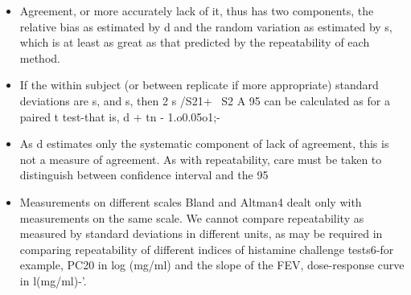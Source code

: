 \documentclass[MAIN.tex]{subfiles}
\begin{document}
\begin{itemize}
\item Agreement, or more accurately lack of it, thus
has two components, the relative bias as estimated by d and the random variation as
estimated by s, which is at least as great as that
predicted by the repeatability of each method.
\item If the within subject (or between replicate if
more appropriate) standard deviations are s,
and s, then
2 s /S21+ ~S2
A 95%
can be calculated as for a paired t test-that is,
d + tn - 1.o0.05o1;-
\item As d estimates only the systematic component
of lack of agreement, this is not a measure of agreement. As with repeatability, care must be taken to distinguish between confidence
interval and the 95%
\newpage
\item Measurements on different scales
Bland and Altman4 dealt only with
measurements on the same scale. We cannot
compare repeatability as measured by standard
deviations in different units, as may be required
in comparing repeatability of different indices
of histamine challenge tests6-for example,
PC20 in log (mg/ml) and the slope of the FEV,
dose-response curve in l(mg/ml)-'. 
\end{itemize}
\end{document}
